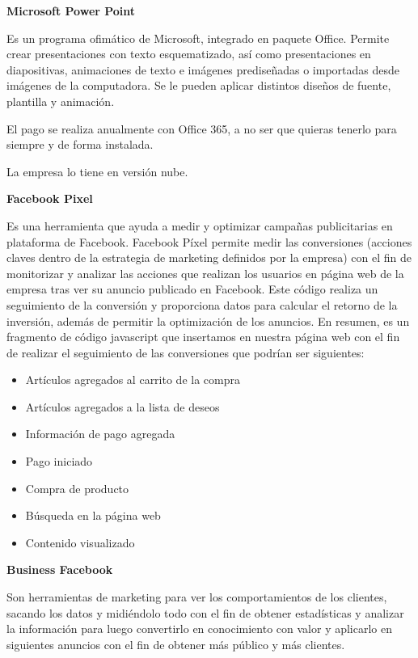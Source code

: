 \documentclass{article}
\begin{document}
\vspace{5mm}

\textbf{Microsoft Power Point}

Es un programa ofimático de Microsoft, integrado en paquete Office. Permite crear presentaciones con texto esquematizado, así como presentaciones en diapositivas, animaciones de texto e imágenes prediseñadas o importadas desde imágenes de la computadora. Se le pueden aplicar distintos diseños de fuente, plantilla y animación. 

El pago se realiza anualmente con Office 365, a no ser que quieras tenerlo para siempre y de forma instalada.  

La empresa lo tiene en versión nube.

\vspace{5mm}

\textbf{Facebook Pixel}

Es una herramienta que ayuda a medir y optimizar campañas publicitarias en plataforma de Facebook. Facebook Píxel permite medir las conversiones (acciones claves dentro de la estrategia de marketing definidos por la empresa) con el fin de monitorizar y analizar las acciones que realizan los usuarios en página web de la empresa tras ver su anuncio publicado en Facebook. Este código realiza un seguimiento de la conversión y proporciona datos para calcular el retorno de la inversión, además de permitir la optimización de los anuncios. En resumen, es un fragmento de código javascript que insertamos en nuestra página web con el fin de realizar el seguimiento de las conversiones que podrían ser siguientes:  

\begin{itemize}
\item Artículos agregados al carrito de la compra
\item Artículos agregados a la lista de deseos
\item Información de pago agregada
\item Pago iniciado 
\item Compra de producto 
\item Búsqueda en la página web 
\item Contenido visualizado
\end{itemize}   

\vspace{5mm}

\textbf{Business Facebook}

Son herramientas de marketing para ver los comportamientos de los clientes, sacando los datos y midiéndolo todo con el fin de obtener estadísticas y analizar la información para luego convertirlo en conocimiento con valor y aplicarlo en siguientes anuncios con el fin de obtener más público y más clientes. 
\end{document}
